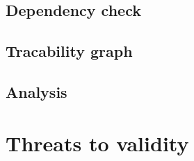 \documentclass[a4paper,twoside,11pt]{article}
\begin{document}
\subsection{Dependency check}
\subsection{Tracability graph}
\subsection{Analysis}

\section{Threats to validity}

\newpage
{}

\noindent	


\begin{thebibliography}{9}
 \end{thebibliography}
\end{document}
